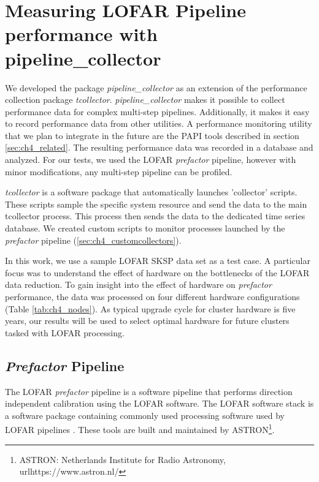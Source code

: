 \section[Measuring LOFAR Pipeline performance with pipeline\_collector]{Measuring LOFAR Pipeline performance with \\pipeline\_collector}\label{sec:ch4_methods}
We developed the package \textit{pipeline\_collector} as an extension of  the performance collection package \textit{tcollector}. \textit{pipeline\_collector} makes it possible to collect performance data for complex multi-step pipelines. Additionally, it makes it easy to record performance data from other utilities. A performance monitoring utility that we plan to integrate in the future are the PAPI tools described in section \ref{sec:ch4_related}. The resulting performance data was recorded in a database and analyzed. For our tests, we used the LOFAR \textit{prefactor} pipeline, however with minor modifications, any multi-step pipeline can be profiled. 

\textit{tcollector} is a software package that automatically launches 'collector' scripts. These scripts sample the specific system resource and send the data to the main tcollector process. This process then sends the data to the dedicated time series database. We created custom scripts to monitor processes launched by the \textit{prefactor} pipeline (\ref{sec:ch4_customcollectors}). 

In this work, we use a sample LOFAR SKSP data set as a test case. A particular focus was to understand the effect of hardware on the bottlenecks of the LOFAR data reduction. To gain insight into the effect of hardware on \textit{prefactor} performance, the data was processed on four different hardware configurations (Table \ref{tab:ch4_nodes}). As typical upgrade cycle for cluster hardware is five years, our results will be used to select optimal hardware for future clusters tasked with LOFAR processing.  

\subsection{\textit{Prefactor} Pipeline}

The LOFAR \textit{prefactor} pipeline \citep{vanweeren2016} is a software pipeline that performs direction independent calibration using the LOFAR software. The LOFAR software stack is a software package containing commonly used processing software used by LOFAR pipelines \citep{cookbook,offringa2013}. These tools are built and maintained by ASTRON\footnote{ASTRON: Netherlands Institute for Radio Astronomy, url{https://www.astron.nl/}}. 

